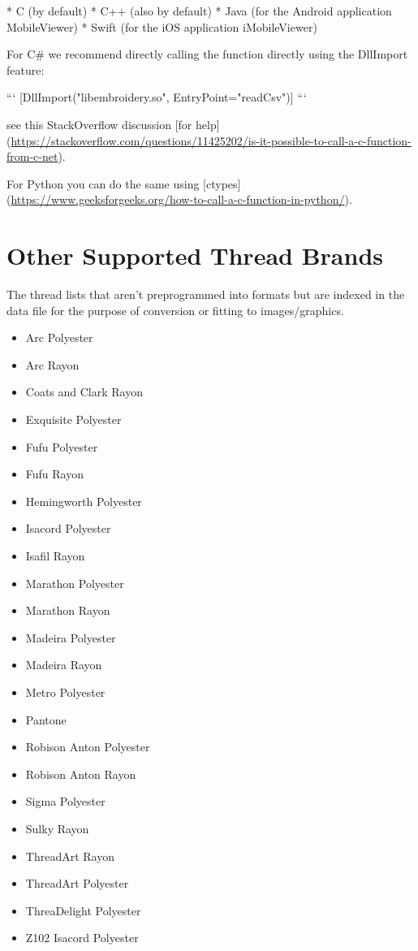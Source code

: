 \documentclass{report}
\begin{document}
  * C (by default)
  * C++ (also by default)
  * Java (for the Android application MobileViewer)
  * Swift (for the iOS application iMobileViewer)

For C\# we recommend directly calling the function directly
using the DllImport feature:

```
[DllImport("libembroidery.so", EntryPoint="readCsv")]
```

see this StackOverflow discussion [for help](\url{https://stackoverflow.com/questions/11425202/is-it-possible-to-call-a-c-function-from-c-net}).

For Python you can do the same using [ctypes](\url{https://www.geeksforgeeks.org/how-to-call-a-c-function-in-python/}).

\section{Other Supported Thread Brands}

The thread lists that aren't preprogrammed into formats but
are indexed in the data file for the purpose of conversion
or fitting to images/graphics.

\begin{itemize}
\item Arc Polyester
\item Arc Rayon
\item Coats and Clark Rayon
\item Exquisite Polyester
\item Fufu Polyester
\item Fufu Rayon
\item Hemingworth Polyester
\item Isacord Polyester
\item Isafil Rayon
\item Marathon Polyester
\item Marathon Rayon
\item Madeira Polyester
\item Madeira Rayon
\item Metro Polyester
\item Pantone
\item Robison Anton Polyester
\item Robison Anton Rayon
\item Sigma Polyester
\item Sulky Rayon
\item ThreadArt Rayon
\item ThreadArt Polyester
\item ThreaDelight Polyester
\item Z102 Isacord Polyester
\end{itemize}




\appendix



\printindex
\end{document}
